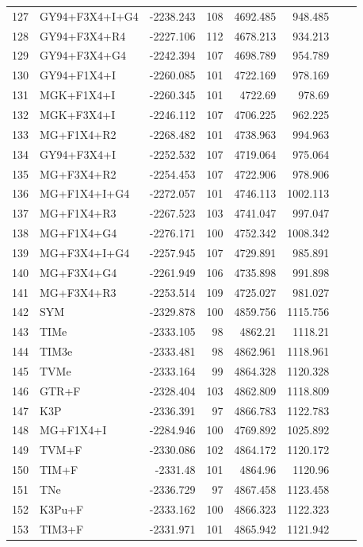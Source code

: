 \documentclass[fleqn,letterpaper]{article}
\begin{document}
\begin{longtable}{clrrrrrr}
	127 & GY94+F3X4+I+G4 & -2238.243 & 108 & 4692.485 & 948.485 \\ 
	128 & GY94+F3X4+R4 & -2227.106 & 112 & 4678.213 & 934.213 \\ 
	129 & GY94+F3X4+G4 & -2242.394 & 107 & 4698.789 & 954.789 \\ 
	130 & GY94+F1X4+I & -2260.085 & 101 & 4722.169 & 978.169 \\ 
	131 & MGK+F1X4+I & -2260.345 & 101 & 4722.69 & 978.69 \\ 
	132 & MGK+F3X4+I & -2246.112 & 107 & 4706.225 & 962.225 \\ 
	133 & MG+F1X4+R2 & -2268.482 & 101 & 4738.963 & 994.963 \\ 
	134 & GY94+F3X4+I & -2252.532 & 107 & 4719.064 & 975.064 \\ 
	135 & MG+F3X4+R2 & -2254.453 & 107 & 4722.906 & 978.906 \\ 
	136 & MG+F1X4+I+G4 & -2272.057 & 101 & 4746.113 & 1002.113 \\ 
	137 & MG+F1X4+R3 & -2267.523 & 103 & 4741.047 & 997.047 \\ 
	138 & MG+F1X4+G4 & -2276.171 & 100 & 4752.342 & 1008.342 \\ 
	139 & MG+F3X4+I+G4 & -2257.945 & 107 & 4729.891 & 985.891 \\ 
	140 & MG+F3X4+G4 & -2261.949 & 106 & 4735.898 & 991.898 \\ 
	141 & MG+F3X4+R3 & -2253.514 & 109 & 4725.027 & 981.027 \\ 
	142 & SYM & -2329.878 & 100 & 4859.756 & 1115.756 \\ 
	143 & TIMe & -2333.105 & 98 & 4862.21 & 1118.21 \\ 
	144 & TIM3e & -2333.481 & 98 & 4862.961 & 1118.961 \\ 
	145 & TVMe & -2333.164 & 99 & 4864.328 & 1120.328 \\ 
	146 & GTR+F & -2328.404 & 103 & 4862.809 & 1118.809 \\ 
	147 & K3P & -2336.391 & 97 & 4866.783 & 1122.783 \\ 
	148 & MG+F1X4+I & -2284.946 & 100 & 4769.892 & 1025.892 \\ 
	149 & TVM+F & -2330.086 & 102 & 4864.172 & 1120.172 \\ 
	150 & TIM+F & -2331.48 & 101 & 4864.96 & 1120.96 \\ 
	151 & TNe & -2336.729 & 97 & 4867.458 & 1123.458 \\ 
	152 & K3Pu+F & -2333.162 & 100 & 4866.323 & 1122.323 \\ 
	153 & TIM3+F & -2331.971 & 101 & 4865.942 & 1121.942 \\ 

\end{longtable}
\end{document}
